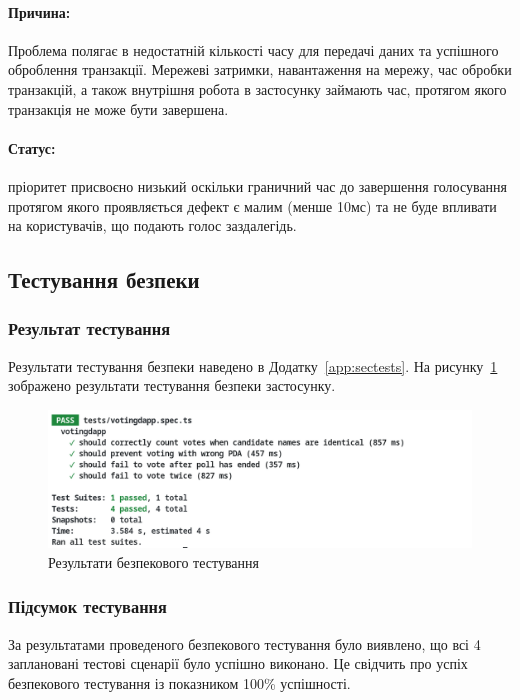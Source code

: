 \documentclass[14pt]{extreport}
\begin{document}
  \paragraph{Причина:} Проблема полягає в недостатній кількості часу для передачі даних та успішного оброблення транзакції. Мережеві затримки, навантаження на мережу, час обробки транзакцій, а також внутрішня робота в застосунку займають час, протягом якого транзакція не може бути завершена.

  \paragraph{Статус:} пріоритет присвоєно низький оскільки граничний час до завершення голосування протягом якого проявляється дефект є малим (менше 10мс) та не буде впливати на користувачів, що подають голос заздалегідь.
  
  \subsection{Тестування безпеки}
  
  \subsubsection*{Результат тестування}
  
  Результати тестування безпеки наведено в Додатку~\ref{app:sectests}. На рисунку~\ref{fig:sectests} зображено результати тестування безпеки застосунку.

  \begin{figure}[H]
    \centering
    \includegraphics[width=\textwidth]{SecTests}
    \caption{Результати безпекового тестування}
    \label{fig:sectests}
  \end{figure}
  
  \subsubsection*{Підсумок тестування}
  
    За результатами проведеного безпекового тестування було виявлено, що всі 4 заплановані тестові сценарії було успішно виконано. Це свідчить про успіх безпекового тестування із показником 100\% успішності.
  
\end{document}
